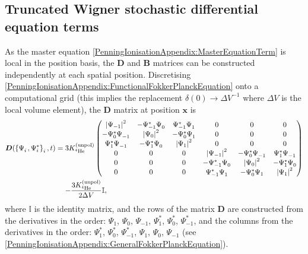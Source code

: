 \subsection{Truncated Wigner stochastic differential equation terms}

As the master equation \eqref{PenningIonisationAppendix:MasterEquationTerm} is local in the position basis, the $\bm{D}$ and $\bm{B}$ matrices can be constructed independently at each spatial position. Discretising \eqref{PenningIonisationAppendix:FunctionalFokkerPlanckEquation} onto a computational grid (this implies the replacement $\delta(0) \rightarrow \Delta V^{-1}$ where $\Delta V$ is the local volume element), the $\bm{D}$ matrix at position $\bm{x}$ is
\begin{align}
    \begin{split}
        \bm{D}(\left\{ \Psi_i^{\phantom{*}}, \Psi_i^* \right\}_i, t) &= 3 \Kunpol
        \begin{pmatrix}
            \abs{\Psi_{-1}}^2 & - \Psi_{-1}^* \Psi_0^{\phantom{*}} & \Psi_{-1}^* \Psi_{1}^{\phantom{*}} & 0 & 0 & 0 \\
            - \Psi_{0}^* \Psi_{-1}^{\phantom{*}} & \abs{\Psi_{0}}^2 & - \Psi_{0}^*\Psi_1^{\phantom{*}} & 0 & 0 & 0 \\
            \Psi_{1}^* \Psi_{-1}^{\phantom{*}} & - \Psi_{1}^* \Psi_0^{\phantom{*}} & \abs{\Psi_{1}}^2  & 0 & 0 & 0 \\
            0 & 0 & 0 & \abs{\Psi_{-1}}^2 & - \Psi_{0}^* \Psi_{-1}^{\phantom{*}} & \Psi_{1}^* \Psi_{-1}^{\phantom{*}} \\
            0 & 0 & 0 & - \Psi_{-1}^* \Psi_0^{\phantom{*}} & \abs{\Psi_{0}}^2 & - \Psi_{1}^* \Psi_0^{\phantom{*}} \\
            0 & 0 & 0 & \Psi_{-1}^* \Psi_{1}^{\phantom{*}} & - \Psi_0^* \Psi_1 & \abs{\Psi_1}^2
        \end{pmatrix}\\
        &\relphantom{=}- \frac{3 \Kunpol}{2 \Delta V} \mathbb{I},
    \end{split}
    \label{PenningIonisationAppendix:DMatrix}
\end{align}
where $\mathbb{I}$ is the identity matrix, and the rows of the matrix $\bm{D}$ are constructed from the derivatives in the order: $\Psi_1^{\phantom{*}}$, $\Psi_0^{\phantom{*}}$, $\Psi_{-1}^{\phantom{*}}$, $\Psi_1^*$, $\Psi_0^*$, $\Psi_{-1}^*$, and the columns from the derivatives in the order: $\Psi_1^*$, $\Psi_0^*$, $\Psi_{-1}^*$, $\Psi_1^{\phantom{*}}$, $\Psi_0^{\phantom{*}}$, $\Psi_{-1}^{\phantom{*}}$ (see \eqref{PenningIonisationAppendix:GeneralFokkerPlanckEquation}).

